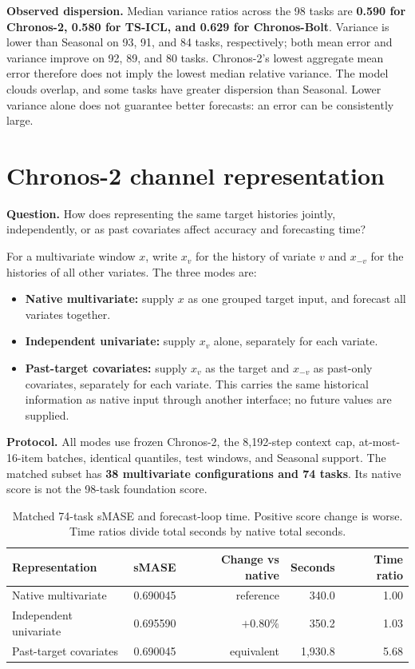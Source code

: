 \documentclass[11pt,a4paper]{article}
\begin{document}
\textbf{Observed dispersion.} Median variance ratios across the 98 tasks
are \textbf{0.590 for Chronos-2, 0.580 for TS-ICL, and 0.629 for
Chronos-Bolt}. Variance is lower than Seasonal on 93, 91, and 84 tasks,
respectively; both mean error and variance improve on 92, 89, and 80 tasks.
Chronos-2's lowest aggregate mean error therefore does not imply the lowest
median relative variance. The model clouds overlap, and some tasks have
greater dispersion than Seasonal. Lower variance alone does not guarantee
better forecasts: an error can be consistently large.

\newpage
\section{Chronos-2 channel representation}
\textbf{Question.} How does representing the same target histories jointly,
independently, or as past covariates affect accuracy and forecasting time?

For a multivariate window $x$, write $x_v$ for the history of variate $v$
and $x_{-v}$ for the histories of all other variates. The three modes are:
\begin{itemize}
\item \textbf{Native multivariate:} supply $x$ as one grouped target input,
and forecast all variates together.
\item \textbf{Independent univariate:} supply $x_v$ alone, separately for
each variate.
\item \textbf{Past-target covariates:} supply $x_v$ as the target and
$x_{-v}$ as past-only covariates, separately for each variate. This carries
the same historical information as native input through another interface;
no future values are supplied.
\end{itemize}

\textbf{Protocol.} All modes use frozen Chronos-2, the 8,192-step context
cap, at-most-16-item batches, identical quantiles, test windows, and Seasonal
support. The matched subset has \textbf{38 multivariate configurations and
74 tasks}. Its native score is not the 98-task foundation score.

\begin{table}[h]
\centering\small
\begin{tabularx}{\linewidth}{@{}Yrrrr@{}}
\toprule
Representation & sMASE & Change vs native & Seconds & Time ratio\\
\midrule
Native multivariate & 0.690045 & reference & 340.0 & 1.00\\
Independent univariate & 0.695590 & $+0.80\%$ & 350.2 & 1.03\\
Past-target covariates & 0.690045 & equivalent & 1,930.8 & 5.68\\
\bottomrule
\end{tabularx}
\caption{Matched 74-task sMASE and forecast-loop time. Positive score change
is worse. Time ratios divide total seconds by native total seconds.}
\end{table}
\end{document}
